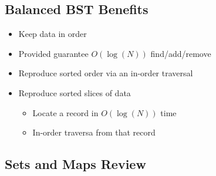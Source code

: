\documentclass[
  10pt,
  english,
  letterpaper,
,tablecaptionabove
]{scrartcl}
\providecommand{\tightlist}{%
  \setlength{\itemsep}{0pt}\setlength{\parskip}{0pt}}
\begin{document}
\hypertarget{balanced-bst-benefits}{%
\subsection{Balanced BST Benefits}\label{balanced-bst-benefits}}

\begin{itemize}
\tightlist
\item
  Keep data in order
\item
  Provided guarantee \(O(\log(N))\) find/add/remove
\item
  Reproduce sorted order via an in-order traversal
\item
  Reproduce sorted slices of data

  \begin{itemize}
  \tightlist
  \item
    Locate a record in \(O(\log(N))\) time
  \item
    In-order traversa from that record
  \end{itemize}
\end{itemize}

\hypertarget{sets-and-maps-review}{%
\subsection{Sets and Maps Review}\label{sets-and-maps-review}}
\end{document}
